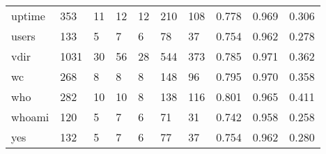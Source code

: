 \begin{longtable}{lp{2.0cm}p{2.0cm}p{2.0cm}p{2.0cm}p{2.0cm}p{2.0cm}p{2.0cm}p{2.0cm}p{2.0cm}}
uptime    &                    353 &                                 11 &                                12 &                               12 &                               210 &                             108 &                                   0.778 &                                  0.969 &                                0.306 \\
users     &                    133 &                                  5 &                                 7 &                                6 &                                78 &                              37 &                                   0.754 &                                  0.962 &                                0.278 \\
vdir      &                   1031 &                                 30 &                                56 &                               28 &                               544 &                             373 &                                   0.785 &                                  0.971 &                                0.362 \\
wc        &                    268 &                                  8 &                                 8 &                                8 &                               148 &                              96 &                                   0.795 &                                  0.970 &                                0.358 \\
who       &                    282 &                                 10 &                                10 &                                8 &                               138 &                             116 &                                   0.801 &                                  0.965 &                                0.411 \\
whoami    &                    120 &                                  5 &                                 7 &                                6 &                                71 &                              31 &                                   0.742 &                                  0.958 &                                0.258 \\
yes       &                    132 &                                  5 &                                 7 &                                6 &                                77 &                              37 &                                   0.754 &                                  0.962 &                                0.280 \\
\end{longtable}
